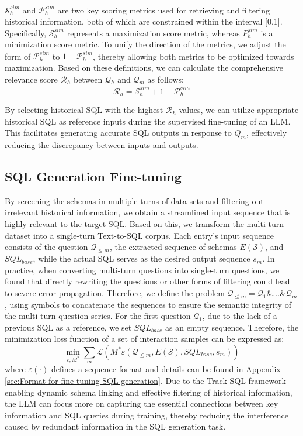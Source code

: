 \documentclass[11pt]{article}
\begin{document}
$\mathcal{S}^{sim}_{h}$ and $\mathcal{P}^{sim}_{h}$ are two key scoring metrics used for retrieving and filtering historical information, both of which are constrained within the interval [0,1]. Specifically, $\mathcal{S}^{sim}_{h}$ represents a maximization score metric, whereas $P^{sim}_{h}$ is a minimization score metric. To unify the direction of the metrics, we adjust the form of $\mathcal{P}^{sim}_{h}$ to $1 - \mathcal{P}^{sim}_{h}$, thereby allowing both metrics to be optimized towards maximization. Based on these definitions, we can calculate the comprehensive relevance score $\mathcal{R}_{h}$ between $\mathcal{Q}_{h}$ and $\mathcal{Q}_{m}$ as follows:
\begin{equation}
    \mathcal{R}_{h} = \mathcal{S}^{sim}_{h} + 1 - \mathcal{P}^{sim}_{h}
\end{equation}

By selecting historical SQL with the highest $\mathcal{R}_{h}$ values, we can utilize appropriate historical SQL as reference inputs during the supervised fine-tuning of an LLM. This facilitates generating accurate SQL outputs in response to $Q_{m}$, effectively reducing the discrepancy between inputs and outputs.

\subsection{SQL Generation Fine-tuning}
\label{sec:SQL Generation Fine-tuning}
By screening the schemas in multiple turns of data sets and filtering out irrelevant historical information, we obtain a streamlined input sequence that is highly relevant to the target SQL. Based on this, we transform the multi-turn dataset into a single-turn Text-to-SQL corpus. Each entry's input sequence consists of the question $\mathcal{Q}_{\le m}$, the extracted sequence of schemas $E(\mathcal{S})$, and $SQL_{base}$, while the actual SQL serves as the desired output sequence $s_{m}$. 
In practice, when converting multi-turn questions into single-turn questions, we found that directly rewriting the questions or other forms of filtering could lead to severe error propagation. Therefore, we define the problem $\mathcal{Q}_{\le m} = \mathcal{Q}_{1} \& ... \& \mathcal{Q}_{m}$, using symbols to concatenate the sequences to ensure the semantic integrity of the multi-turn question series. For the first question $\mathcal{Q}_{1}$, due to the lack of a previous SQL as a reference, we set $SQL_{base}$ as an empty sequence.
Therefore, the minimization loss function of a set of interaction samples can be expressed as:
\begin{equation}
    \min_{\varepsilon ,M^{*}} \sum_{m}^{} \mathcal{L}(M^{*}\varepsilon  (\mathcal{Q}_{\le m},E(\mathcal{S}),SQL_{base},s_{m}))
\end{equation}
where $\varepsilon(\cdot)$ defines a sequence format and details can be found in Appendix \ref{sec:Format for fine-tuning SQL generation}.
Due to the Track-SQL framework enabling dynamic schema linking and effective filtering of historical information, the LLM can focus more on capturing the essential connections between key information and SQL queries during training, thereby reducing the interference caused by redundant information in the SQL generation task.
\end{document}
